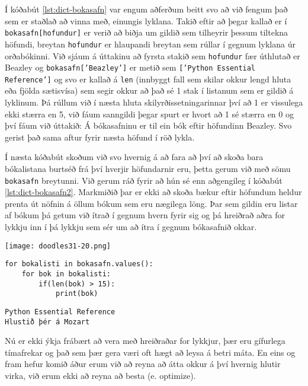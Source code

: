Í kóðabút \ref{lst:dict-bokasafn} var engum aðferðum beitt svo að við fengum það sem er staðlað að vinna með, einungis lyklana.
Takið eftir að þegar kallað er í \texttt{bokasafn[hofundur]} er verið að biðja um gildið sem tilheyrir þessum tiltekna höfundi, breytan \texttt{hofundur} er hlaupandi breytan sem rúllar í gegnum lyklana úr orðabókinni.
Við sjáum á úttakinu að fyrsta stakið sem \texttt{hofundur} fær úthlutað er Beazley og \texttt{bokasafn['Beazley']} er metið sem \texttt{['Python Essential Reference']} og svo er kallað á \texttt{len} (innbyggt fall sem skilar okkur lengd hluta eða fjölda sætisvísa) sem segir okkur að það sé 1 stak í listanum sem er gildið á lyklinum.
Þá rúllum við í næsta hluta skilyrðissetningarinnar því að 1 er vissulega ekki stærra en 5, við fáum sanngildi þegar spurt er hvort að 1 sé stærra en 0 og því fáum við úttakið: Á bókasafninu er til ein bók eftir höfundinn Beazley.
Svo gerist það sama aftur fyrir næsta höfund í röð lykla.

Í næsta kóðabút skoðum við svo hvernig á að fara að því að skoða bara bókalistana burtséð frá því hverjir höfundarnir eru, þetta gerum við með sömu \texttt{bokasafn} breytunni.
Við gerum ráð fyrir að hún sé enn aðgengileg í kóðabút \ref{lst:dict-bokasafn2}.
Markmiðið þar er ekki að skoða bækur eftir höfundum heldur prenta út nöfnin á öllum bókum sem eru nægilega löng.
Þar sem gildin eru listar af bókum þá getum við ítrað í gegnum hvern fyrir sig og þá hreiðrað aðra for lykkju inn í þá lykkju sem sér um að ítra í gegnum bókasafnið okkar.

	\begin{center}
		\texttt{[image: doodles31-20.png]}
	\end{center}
		
\begin{lstlisting}[caption=Ítrun í gegnum orðabækur með .values(), label=lst:dict-bokasafn2]
for bokalisti in bokasafn.values():
	for bok in bokalisti:
		if(len(bok) > 15):
			print(bok)
\end{lstlisting}
\lstset{style=uttak}
\begin{lstlisting}
Python Essential Reference
Hlustið þér á Mozart
\end{lstlisting}
\lstset{style=venjulegt}

Nú er ekki ýkja frábært að vera með hreiðraðar for lykkjur, þær eru gífurlega tímafrekar og það sem þær gera væri oft hægt að leysa á betri máta.
En eins og fram hefur komið áður erum við að reyna að átta okkur á því hvernig hlutir virka, við erum ekki að reyna að besta (e. optimize).

